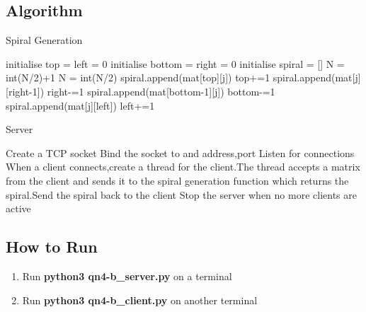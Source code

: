 \documentclass{article}
\begin{document}
    \subsection{Algorithm}
        \begin{algorithm}[H]
            \caption{Spiral Generation}
            \begin{algorithmic}
               \State initialise top = left = 0
               \State initialise bottom = right = 0
               \State initialise spiral = []
                    \State N = int(N/2)+1
                \Else
                    \State N = int(N/2)
                \EndIf
                        \State spiral.append(mat[top][j])
                    \EndFor
                    \State top+=1
                        \State spiral.append(mat[j][right-1])
                    \EndFor
                    \State right-=1
                        \State spiral.append(mat[bottom-1][j])
                    \EndFor
                    \State bottom-=1
                        \State spiral.append(mat[j][left])
                    \EndFor
                    left+=1
                \EndFor
            
            \end{algorithmic}
            \end{algorithm}
         \begin{algorithm}[H]
            \caption{Server}
            \begin{algorithmic}
                \State Create a TCP socket
                \State Bind the socket to and address,port
                \State Listen for connections 
                \State When a client connects,create a thread for the client.The thread accepts a matrix from the client and sends it to the spiral generation function which returns the spiral.Send the spiral back to the client
                \State Stop the server when no more clients are active
            \end{algorithmic}
            \end{algorithm}
    \subsection{How to Run}
    \begin{enumerate}
          \item Run \textbf{python3 qn4-b\_server.py} on a terminal
        \item Run \textbf{python3 qn4-b\_client.py} on another terminal
    \end{enumerate}
      
\end{document}
